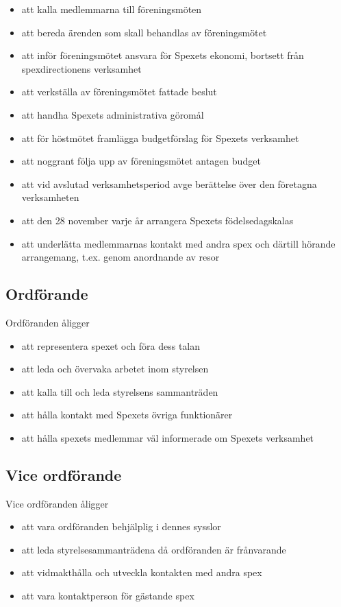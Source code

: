 \documentclass[a4paper]{article}
\begin{document}
\begin{itemize}
  \item att kalla medlemmarna till föreningsmöten
  \item att bereda ärenden som skall behandlas av föreningsmötet
  \item att inför föreningsmötet ansvara för Spexets ekonomi, bortsett från spexdirectionens verksamhet
  \item att verkställa av föreningsmötet fattade beslut
  \item att handha Spexets administrativa göromål
  \item att för höstmötet framlägga budgetförslag för Spexets verksamhet
  \item att noggrant följa upp av föreningsmötet antagen budget
  \item att vid avslutad verksamhetsperiod avge berättelse över den företagna verksamheten
  \item att den 28 november varje år arrangera Spexets födelsedagskalas
  \item att underlätta medlemmarnas kontakt med andra spex och därtill hörande arrangemang, t.ex. genom anordnande av resor
\end{itemize}

\subsection{Ordförande}
Ordföranden åligger

\begin{itemize}
  \item att representera spexet och föra dess talan
  \item att leda och övervaka arbetet inom styrelsen
  \item att kalla till och leda styrelsens sammanträden
  \item att hålla kontakt med Spexets övriga funktionärer
  \item att hålla spexets medlemmar väl informerade om Spexets verksamhet
\end{itemize}

\subsection{Vice ordförande}
Vice ordföranden åligger

\begin{itemize}
  \item att vara ordföranden behjälplig i dennes sysslor
  \item att leda styrelsesammanträdena då ordföranden är frånvarande
  \item att vidmakthålla och utveckla kontakten med andra spex
  \item att vara kontaktperson för gästande spex
\end{itemize}
\end{document}
